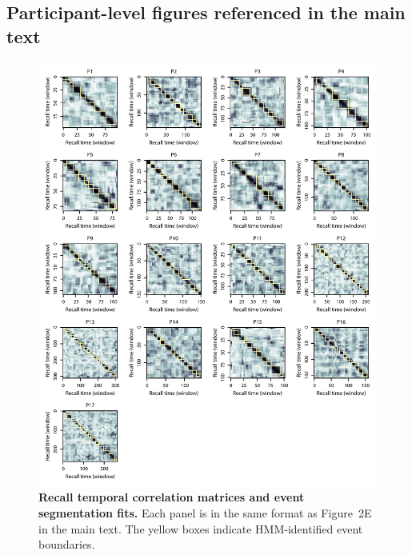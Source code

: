 \documentclass{article}
\newcommand{\topicprops}{2}
\begin{document}
\newpage
\begin{centering}
 \vspace*{\fill}
    \section*{Participant-level figures referenced in the main text}
    \vspace*{\fill}
  \end{centering}

\begin{figure}[p!]
\centering
\includegraphics[width=\textwidth]{figs/corrmats}
\caption{\small \textbf{Recall temporal correlation matrices and event segmentation fits.} Each panel is in the same format as Figure~\topicprops E in the main text.  The yellow boxes indicate HMM-identified event boundaries.}
\label{fig:corrmats}
\end{figure}
\end{document}
